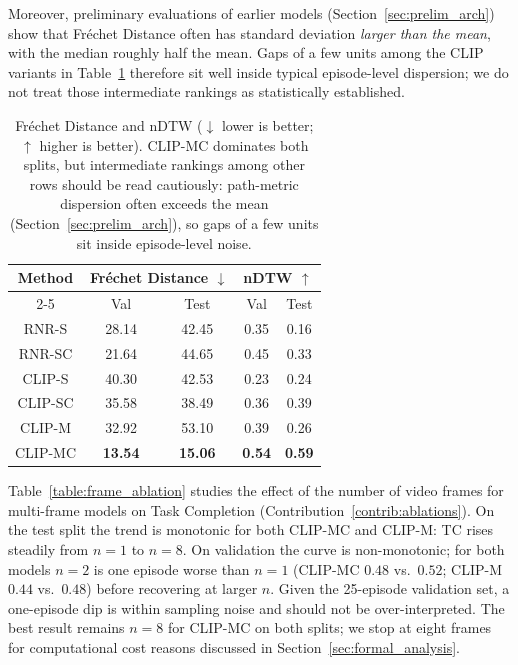Moreover, preliminary evaluations of earlier models (Section~\ref{sec:prelim_arch}) show that Fr\'{e}chet Distance often has standard deviation \emph{larger than the mean}, with the median roughly half the mean. Gaps of a few units among the CLIP variants in Table~\ref{table:path_metrics} therefore sit well inside typical episode-level dispersion; we do not treat those intermediate rankings as statistically established.

\begin{table}[ht]
\begin{center}
\begin{tabular}{|c|cc|cc|}
\hline
\multirow{2}{*}{Method} & \multicolumn{2}{c|}{Fr\'{e}chet Distance $\downarrow$} & \multicolumn{2}{c|}{nDTW $\uparrow$} \\ \cline{2-5}
        & \multicolumn{1}{c|}{Val} & Test & \multicolumn{1}{c|}{Val} & Test \\ \hline
RNR-S   & \multicolumn{1}{c|}{28.14} & 42.45 & \multicolumn{1}{c|}{0.35} & 0.16 \\ \hline
RNR-SC  & \multicolumn{1}{c|}{21.64} & 44.65 & \multicolumn{1}{c|}{0.45} & 0.33 \\ \hline
CLIP-S  & \multicolumn{1}{c|}{40.30} & 42.53 & \multicolumn{1}{c|}{0.23} & 0.24 \\ \hline
CLIP-SC & \multicolumn{1}{c|}{35.58} & 38.49 & \multicolumn{1}{c|}{0.36} & 0.39 \\ \hline
CLIP-M  & \multicolumn{1}{c|}{32.92} & 53.10 & \multicolumn{1}{c|}{0.39} & 0.26 \\ \hline
CLIP-MC & \multicolumn{1}{c|}{\textbf{13.54}} & \textbf{15.06} & \multicolumn{1}{c|}{\textbf{0.54}} & \textbf{0.59} \\ \hline
\end{tabular}
\end{center}
\caption[Fr\'{e}chet Distance and nDTW]{Fr\'{e}chet Distance and nDTW ($\downarrow$ lower is better; $\uparrow$ higher is better). CLIP-MC dominates both splits, but intermediate rankings among other rows should be read cautiously: path-metric dispersion often exceeds the mean (Section~\ref{sec:prelim_arch}), so gaps of a few units sit inside episode-level noise.}
\label{table:path_metrics}
\end{table}

Table~\ref{table:frame_ablation} studies the effect of the number of video frames for multi-frame models on Task Completion (Contribution~\ref{contrib:ablations}). On the test split the trend is monotonic for both CLIP-MC and CLIP-M: TC rises steadily from $n=1$ to $n=8$. On validation the curve is non-monotonic; for both models $n=2$ is one episode worse than $n=1$ (CLIP-MC $0.48$ vs.\ $0.52$; CLIP-M $0.44$ vs.\ $0.48$) before recovering at larger $n$. Given the 25-episode validation set, a one-episode dip is within sampling noise and should not be over-interpreted. The best result remains $n=8$ for CLIP-MC on both splits; we stop at eight frames for computational cost reasons discussed in Section~\ref{sec:formal_analysis}.

